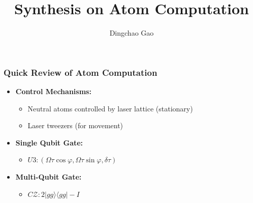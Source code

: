 \documentclass[18 pt]{beamer}
\title{Synthesis on Atom Computation}
\author[Gcc]{Dingchao Gao}
\institute[ISCAS]{Institute of Software Chinese Academy of Sciences}
\begin{document}
\begin{frame}[plain]
    \titlepage
  \end{frame}

\begin{frame}
    \frametitle{Quick Review of Atom Computation}
    \begin{itemize}
        \item \textbf{Control Mechanisms:} 
            \begin{itemize}
                \item Neutral atoms controlled by laser lattice (stationary) 
                \item Laser tweezers (for movement)
            \end{itemize}
        \item \textbf{Single Qubit Gate:} 
            \begin{itemize}
                \item $U3: (\Omega\tau\cos{\varphi}, \Omega\tau\sin{\varphi}, \delta\tau)$
            \end{itemize}
        \item \textbf{Multi-Qubit Gate:} 
            \begin{itemize}
                \item $C\mathcal{Z}: 2|gg\rangle\langle gg| - I$
            \end{itemize}
    \end{itemize}
\end{frame}

\end{document}
